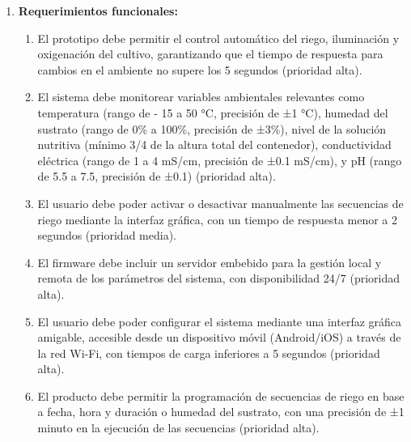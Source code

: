\documentclass[
11pt, %
]{charter}
\begin{document}
\begin{enumerate}
	\item \textbf{Requerimientos funcionales:}
\begin{enumerate}
    \item El prototipo debe permitir el control automático del riego, iluminación y oxigenación del cultivo, garantizando que el tiempo de respuesta para cambios en el ambiente no supere los 5 segundos (prioridad alta).
    
    \item El sistema debe monitorear variables ambientales relevantes como temperatura (rango de - 15 a 50 °C, precisión de ±1 °C), humedad del sustrato (rango de 0\% a 100\%, precisión de ±3\%), nivel de la solución nutritiva (mínimo 3/4 de la altura total del contenedor), conductividad eléctrica (rango de 1 a 4 mS/cm, precisión de ±0.1 mS/cm), y pH (rango de 5.5 a 7.5, precisión de ±0.1) (prioridad alta).
    
    \item El usuario debe poder activar o desactivar manualmente las secuencias de riego mediante la interfaz gráfica, con un tiempo de respuesta menor a 2 segundos (prioridad media).
     
    
    \item El firmware debe incluir un servidor embebido para la gestión local y remota de los parámetros del sistema, con disponibilidad 24/7 (prioridad alta).
    
    \item El usuario debe poder configurar el sistema mediante una interfaz gráfica amigable, accesible desde un dispositivo móvil (Android/iOS) a través de la red Wi-Fi, con tiempos de carga inferiores a 5 segundos (prioridad alta).
    
    \item El producto debe permitir la programación de secuencias de riego en base a fecha, hora y duración o humedad del sustrato, con una precisión de ±1 minuto en la ejecución de las secuencias (prioridad alta).
    
\end{enumerate}


\end{enumerate}
\end{document}
